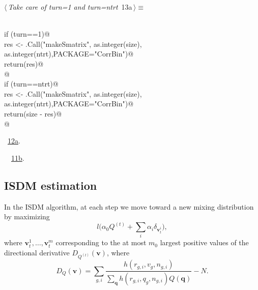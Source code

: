 \documentclass[reqno]{amsart}
\renewcommand{\NWtarget}[2]{\hypertarget{#1}{#2}}
\renewcommand{\NWlink}[2]{\hyperlink{#1}{#2}}
\newcommand{\bv}{\mathbf{v}}
\newcommand{\bq}{\mathbf{q}}
\begin{document}
\begin{flushleft} \small
\begin{minipage}{\linewidth}\label{scrap20}\raggedright\small
\NWtarget{nuweb13a}{} $\langle\,${\itshape Take care of turn=1 and turn=ntrt}\nobreak\ {\footnotesize {13a}}$\,\rangle\equiv$
\vspace{-1ex}
\begin{list}{}{} \item
\mbox{}\verb@@\\
\mbox{}\verb@  if (turn==1){@\\
\mbox{}\verb@     res <- .Call("makeSmatrix", as.integer(size), as.integer(ntrt),PACKAGE="CorrBin")@\\
\mbox{}\verb@     return(res)@\\
\mbox{}\verb@  }@\\
\mbox{}\verb@  if (turn==ntrt){@\\
\mbox{}\verb@     res <- .Call("makeSmatrix", as.integer(size), as.integer(ntrt),PACKAGE="CorrBin")@\\
\mbox{}\verb@     return(size - res)@\\
\mbox{}\verb@  }@\\
\mbox{}\verb@@{\NWsep}
\end{list}
\vspace{-1.5ex}
\footnotesize
\begin{list}{}{\setlength{\itemsep}{-\parsep}\setlength{\itemindent}{-\leftmargin}}
\item \NWtxtMacroRefIn\ \NWlink{nuweb12a}{12a}.
\item \NWtxtIdentsUsed\nobreak\  \verb@makeSmatrix@\nobreak\ \NWlink{nuweb11b}{11b}.
\item{}
\end{list}
\end{minipage}\vspace{4ex}
\end{flushleft}
\subsection{ISDM estimation}

In the ISDM algorithm, at each step we move toward a new mixing distribution
by maximizing
\begin{equation}
l\big(\alpha_0Q^{(t)}+\sum_{i}\alpha_i\delta_{\bv^i_t}\big),
\end{equation}
where $\bv^1_t, \ldots, \bv^m_t$ corresponding to the at
most $m_0$ largest positive values of the directional derivative 
$D_{Q^{(t)}}(\bv)$, where
\begin{equation}\label{E:D}
D_Q(\bv ) = \sum_{g,i}\frac{h(r_{g,i},v_g,n_{g,i})}{\sum_\bq
h(r_{g,i},q_g,n_{g,i})Q(\bq)}-N.
\end{equation}
\end{document}
